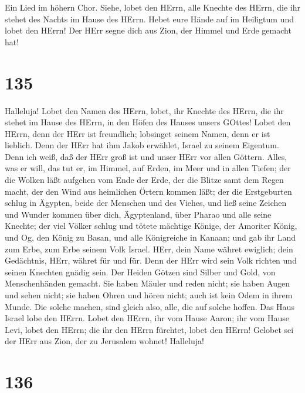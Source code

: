  Ein Lied im höhern Chor. Siehe, lobet den HErrn, alle
Knechte des HErrn, die ihr stehet des Nachts im Hause des HErrn.
 Hebet eure Hände auf im Heiligtum und lobet den HErrn!
 Der HErr segne dich aus Zion, der Himmel und Erde gemacht
hat!

\hypertarget{section-134}{%
\section{135}\label{section-134}}

 Halleluja! Lobet den Namen des HErrn, lobet, ihr Knechte
des HErrn,  die ihr stehet im Hause des HErrn, in den Höfen
des Hauses unsers GOttes!  Lobet den HErrn, denn der HErr
ist freundlich; lobsinget seinem Namen, denn er ist lieblich.
 Denn der HErr hat ihm Jakob erwählet, Israel zu seinem
Eigentum.  Denn ich weiß, daß der HErr groß ist und unser
HErr vor allen Göttern.  Alles, was er will, das tut er, im
Himmel, auf Erden, im Meer und in allen Tiefen;  der die
Wolken läßt aufgehen vom Ende der Erde, der die Blitze samt dem Regen
macht, der den Wind aus heimlichen Örtern kommen läßt;  der
die Erstgeburten schlug in Ägypten, beide der Menschen und des Viehes,
 und ließ seine Zeichen und Wunder kommen über dich,
Ägyptenland, über Pharao und alle seine Knechte;  der viel
Völker schlug und tötete mächtige Könige,  der Amoriter
König, und Og, den König zu Basan, und alle Königreiche in Kanaan;
 und gab ihr Land zum Erbe, zum Erbe seinem Volk Israel.
 HErr, dein Name währet ewiglich; dein Gedächtnis, HErr,
währet für und für.  Denn der HErr wird sein Volk richten
und seinen Knechten gnädig sein.  Der Heiden Götzen sind
Silber und Gold, von Menschenhänden gemacht.  Sie haben
Mäuler und reden nicht; sie haben Augen und sehen nicht; 
sie haben Ohren und hören nicht; auch ist kein Odem in ihrem Munde.
 Die solche machen, sind gleich also, alle, die auf solche
hoffen.  Das Haus Israel lobe den HErrn. Lobet den HErrn,
ihr vom Hause Aaron;  ihr vom Hause Levi, lobet den HErrn;
die ihr den HErrn fürchtet, lobet den HErrn!  Gelobet sei
der HErr aus Zion, der zu Jerusalem wohnet! Halleluja!

\hypertarget{section-135}{%
\section{136}\label{section-135}}

